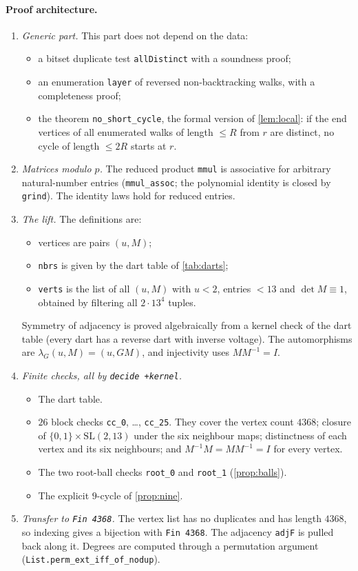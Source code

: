 \documentclass[11pt]{article}
\numberwithin{equation}{section}
\theoremstyle{definition}
\theoremstyle{remark}
\newcommand{\SL}{\mathrm{SL}}
\begin{document}
\paragraph{Proof architecture.}
\begin{enumerate}
\item \emph{Generic part.} This part does not depend on the data:
  \begin{itemize}
  \item a bitset duplicate test \texttt{allDistinct} with a soundness proof;
  \item an enumeration \texttt{layer} of reversed non-backtracking walks, with a completeness proof;
  \item the theorem \texttt{no\_short\_cycle}, the formal version of \cref{lem:local}: if the end
    vertices of all enumerated walks of length $\le R$ from $r$ are distinct, no cycle of
    length $\le 2R$ starts at $r$.
  \end{itemize}
\item \emph{Matrices modulo $p$.} The reduced product \texttt{mmul} is associative for arbitrary
  natural-number entries (\texttt{mmul\_assoc}; the polynomial identity is closed by
  \texttt{grind}). The identity laws hold for reduced entries.
\item \emph{The lift.} The definitions are:
  \begin{itemize}
  \item vertices are pairs $(u,M)$;
  \item \texttt{nbrs} is given by the dart table of \cref{tab:darts};
  \item \texttt{verts} is the list of all $(u,M)$ with $u<2$, entries $<13$ and $\det M\equiv1$,
    obtained by filtering all $2\cdot 13^4$ tuples.
  \end{itemize}
  Symmetry of adjacency is proved algebraically from a kernel check of the dart table
  (every dart has a reverse dart with inverse voltage). The automorphisms are
  $\lambda_G(u,M)=(u,GM)$, and injectivity uses $MM^{-1}=I$.
\item \emph{Finite checks, all by \texttt{decide +kernel}.}
  \begin{itemize}
  \item The dart table.
  \item $26$ block checks \texttt{cc\_0}, \dots, \texttt{cc\_25}. They cover the vertex count
    $4368$; closure of $\{0,1\}\times\SL(2,13)$ under the six neighbour maps; distinctness of each
    vertex and its six neighbours; and $M^{-1}M=MM^{-1}=I$ for every vertex.
  \item The two root-ball checks \texttt{root\_0} and \texttt{root\_1} (\cref{prop:balls}).
  \item The explicit $9$-cycle of \cref{prop:nine}.
  \end{itemize}
\item \emph{Transfer to \texttt{Fin 4368}.} The vertex list has no duplicates and has length
  $4368$, so indexing gives a bijection with \texttt{Fin 4368}. The adjacency \texttt{adjF} is
  pulled back along it. Degrees are computed through a permutation argument
  (\texttt{List.perm\_ext\_iff\_of\_nodup}).
\end{enumerate}
\end{document}
